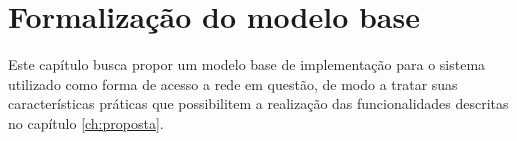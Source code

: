 \chapter{Formalização do modelo base}
\label{ch:implementacao}

Este capítulo busca propor um modelo base de implementação para o sistema utilizado como forma de acesso a rede em questão, de modo a tratar suas características práticas que possibilitem a realização das funcionalidades descritas no capítulo \ref{ch:proposta}.